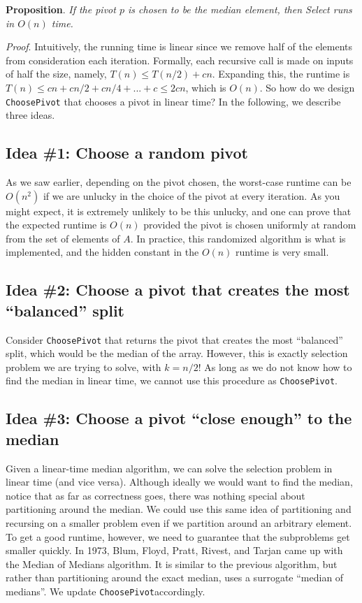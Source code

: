 \documentclass [12pt]{article}
\begin{document}
\textbf{Proposition}. \textit{If the pivot $p$ is chosen to be the median element, then Select runs in $O(n)$ time.}

\textit{Proof}. Intuitively, the running time is linear since we remove half of the elements from consideration each iteration. Formally, each recursive call is made on inputs of half the size, namely, $T(n) \leq T(n/2)+cn$. Expanding this, the runtime is $T(n) \leq cn+cn/2+cn/4+...+c \leq 2cn$, which is $O(n)$. So how do we design \texttt{ChoosePivot} that chooses a pivot in linear time? In the following, we describe three ideas.

\subsection{Idea \#1: Choose a random pivot}

As we saw earlier, depending on the pivot chosen, the worst-case runtime can be $O(n^2)$ if we are unlucky in the choice of the pivot at every iteration. As you might expect, it is extremely unlikely to be this unlucky, and one can prove that the expected runtime is $O(n)$ provided the pivot is chosen uniformly at random from the set of elements of $A$. In practice, this randomized algorithm is what is implemented, and the hidden constant in the $O(n)$ runtime is very small.

\subsection{Idea \#2: Choose a pivot that creates the most ``balanced'' split}

Consider \texttt{ChoosePivot} that returns the pivot that creates the most ``balanced'' split, which would be the median of the array. However, this is exactly selection problem we are trying to solve, with $k = n/2$! As long as we do not know how to find the median in linear time, we cannot use this procedure as \texttt{ChoosePivot}.

\subsection{Idea \#3: Choose a pivot ``close enough'' to the median}
Given a linear-time median algorithm, we can solve the selection problem in linear time (and vice versa). Although ideally we would want to find the median, notice that as far as correctness goes, there was nothing special about partitioning around the median. We could use this same idea of partitioning and recursing on a smaller problem even if we partition around an arbitrary element. To get a good runtime, however, we need to guarantee that the subproblems get smaller quickly. In 1973, Blum, Floyd, Pratt, Rivest, and Tarjan came up with the Median of Medians algorithm. It is similar to the previous algorithm, but rather than partitioning around the exact median, uses a surrogate ``median of medians''. We update \texttt{ChoosePivot}accordingly.
\end{document}
